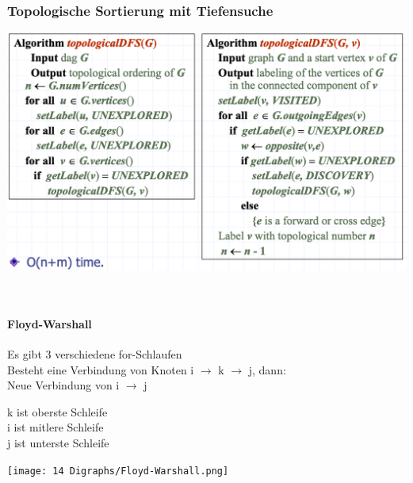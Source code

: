 \subsubsection{Topologische Sortierung mit Tiefensuche}
\begin{center}
    \includegraphics[scale=.28]{graphic/14 Digraphs/topologische Sortierung mit Tiefensuche.png}
\end{center}
\vspace{-8pt}

\vfill
$ $
\columnbreak
\paragraph{Floyd-Warshall}
Es gibt 3 verschiedene for-Schlaufen\\

Besteht eine Verbindung von Knoten i $\rightarrow$ k $\rightarrow$ j, dann:\\
Neue Verbindung von i $\rightarrow$ j

k ist oberste Schleife\\
i ist mitlere Schleife\\
j ist unterste Schleife\\

\begin{center}
    \texttt{[image: 14 Digraphs/Floyd-Warshall.png]}
\end{center}
\newpage